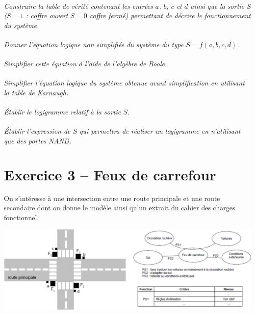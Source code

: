 \documentclass[11pt,oneside]{article}
\begin{document}
\paragraph{}
\textit{Construire la table de vérité contenant les entrées $a$, $b$, $c$ et $d$ ainsi que la sortie $S$ ($S=1$ : coffre ouvert $S=0$ coffre fermé) permettant de décrire le fonctionnement du système.}

\paragraph{}
\textit{Donner l'équation logique non simplifiée du système du type $S=f(a,b,c,d)$.}

\paragraph{}
\textit{Simplifier cette équation à l'aide de l'algèbre de Boole.}

\paragraph{}
\textit{Simplifier l'équation logique du système obtenue avant simplification en utilisant la table de Karnaugh.}

\paragraph{}
\textit{Établir le logigramme relatif à la sortie $S$.}

\paragraph{}
\textit{Établir l'expression de $S$ qui permettra de réaliser un logigramme en n'utilisant que des portes NAND.}


\section*{Exercice 3 -- Feux de carrefour}
On s'intéresse à une intersection entre une route principale et une route secondaire dont on donne le modèle ainsi qu'un extrait du cahier des charges fonctionnel.

\setcounter{paragraph}{0}


\begin{center}
\includegraphics[width=.9\textwidth]{png/fig5}
\end{center}
\end{document}
